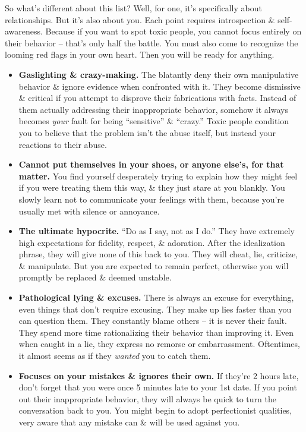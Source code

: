 \documentclass{article}
\numberwithin{equation}{section}
\begin{document}
So what's different about this list? Well, for one, it's specifically about relationships. But it's also about you. Each point requires introspection \& self-awareness. Because if you want to spot toxic people, you cannot focus entirely on their behavior -- that's only half the battle. You must also come to recognize the looming red flags in your own heart. Then you will be ready for anything.
\begin{itemize}
	\item \textbf{Gaslighting \& crazy-making.} The blatantly deny their own manipulative behavior \& ignore evidence when confronted with it. They become dismissive \& critical if you attempt to disprove their fabrications with facts. Instead of them actually addressing their inappropriate behavior, somehow it always becomes \textit{your} fault for being ``sensitive'' \& ``crazy.'' Toxic people condition you to believe that the problem isn't the abuse itself, but instead your reactions to their abuse.
	\item \textbf{Cannot put themselves in your shoes, or anyone else's, for that matter.} You find yourself desperately trying to explain how they might feel if you were treating them this way, \& they just stare at you blankly. You slowly learn not to communicate your feelings with them, because you're usually met with silence or annoyance.
	\item \textbf{The ultimate hypocrite.} ``Do as I say, not as I do.'' They have extremely high expectations for fidelity, respect, \& adoration. After the idealization phrase, they will give none of this back to you. They will cheat, lie, criticize, \& manipulate. But you are expected to remain perfect, otherwise you will promptly be replaced \& deemed unstable.
	\item \textbf{Pathological lying \& excuses.} There is always an excuse for everything, even things that don't require excusing. They make up lies faster than you can question them. They constantly blame others -- it is never their fault. They spend more time rationalizing their behavior than improving it. Even when caught in a lie, they express no remorse or embarrassment. Oftentimes, it almost seems as if they \textit{wanted} you to catch them.
	\item \textbf{Focuses on your mistakes \& ignores their own.} If they're 2 hours late, don't forget that you were once 5 minutes late to your 1st date. If you point out their inappropriate behavior, they will always be quick to turn the conversation back to you. You might begin to adopt perfectionist qualities, very aware that any mistake can \& will be used against you.

\end{itemize}
\end{document}
